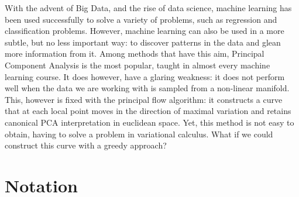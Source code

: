 \documentclass[12pt]{report}
\begin{document}
With the advent of Big Data, and the rise of data science,
machine learning has been used successfully to solve a variety of problems, 
such as regression and classification problems. However, machine learning
can also be used in a more subtle, but no less important way: to discover patterns
in the data and glean more information from it. Among methods that have this aim, 
Principal Component Analysis is the most popular, taught in almost every
machine learning course. It does however, have a glaring weakness: it does 
not perform well when the data we are working with is sampled from a non-linear manifold. 
This, however is fixed with the principal flow algorithm: 
it constructs a curve that at each local point moves in the direction of
maximal variation and retains canonical PCA interpretation in euclidean space.
Yet, this method is not easy to obtain, having to solve a problem in variational calculus. 
What if we could construct this curve with a greedy approach? 

\newpage

\section{Notation}
\end{document}
